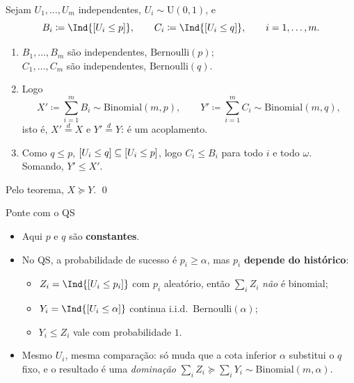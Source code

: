 \documentclass[aspectratio=169]{beamer}
\begin{document}
\begin{frame}

  Sejam $U_1,\dots,U_m$ independentes, $U_i\sim\mathrm{U}(0,1)$, e
  \[
    B_i\coloneqq\Ind{\colch{U_i\leq p}},
    \qquad
    C_i\coloneqq\Ind{\colch{U_i\leq q}},
    \qquad i=1,\dots,m.
  \]

  \vfill

  \begin{enumerate}\itemsep=.2cm
  \item $B_1,\dots,B_m$ são independentes, $\mathrm{Bernoulli}(p)$;\\
    $C_1,\dots,C_m$ são independentes, $\mathrm{Bernoulli}(q)$.
  \item Logo
    \[
      X'\coloneqq\sum_{i=1}^mB_i\sim\mathrm{Binomial}(m,p),
      \qquad
      Y'\coloneqq\sum_{i=1}^mC_i\sim\mathrm{Binomial}(m,q),
    \]
    isto é, $X'\stackrel d=X$ e $Y'\stackrel d=Y$: é um acoplamento.
  \item Como $q\leq p$, $\lbrack U_i\leq q\rbrack\subseteq\lbrack U_i\leq p\rbrack$,
    logo $C_i\leq B_i$ para todo $i$ e todo $\omega$. Somando,
    $Y'\leq X'$.
  \end{enumerate}

  \vfill

  Pelo teorema, $X\succeq Y$. \qed




\end{frame}
\begin{frame}{Ponte com o QS}

  \begin{itemize}\itemsep=.4cm
  \item Aqui $p$ e $q$ são \textbf{constantes}.
  \item No QS, a probabilidade de sucesso é $p_i\geq\alpha$, mas
    $p_i$ \textbf{depende do histórico}:
    \begin{itemize}\itemsep=.2cm
    \item $Z_i=\Ind{\colch{U_i\leq p_i}}$ com $p_i$ aleatório, então
      $\sum_iZ_i$ \emph{não} é binomial;
    \item $Y_i=\Ind{\colch{U_i\leq\alpha}}$ continua i.i.d.\
      $\mathrm{Bernoulli}(\alpha)$;
    \item $Y_i\leq Z_i$ vale com probabilidade $1$.
    \end{itemize}
  \item Mesmo $U_i$, mesma comparação: só muda que a cota inferior
    $\alpha$ substitui o $q$ fixo, e o resultado é uma \emph{dominação}
     $\sum_iZ_i \succeq \sum_i Y_i \sim \mathrm{Binomial}(m,\alpha)$.
  \end{itemize}

\end{frame}
\end{document}
